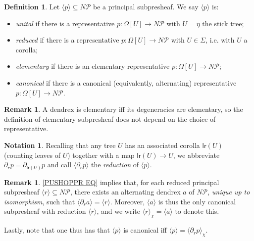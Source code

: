 \documentclass[a4paper,10pt
,draft
]{article}%
\numberwithin{equation}{section}
\numberwithin{figure}{section}
\theoremstyle{definition} %
\newtheorem{definition}[equation]{Definition}%
\newtheorem{remark}[equation]{Remark}%
\newtheorem{notation}[equation]{Notation}%
\newcommand{\1}{\ensuremath{\mathbbm 1}}%
\begin{document}
\begin{definition}
	Let $\langle p \rangle \subseteq N \mathcal{P}$ be 
	a principal subpresheaf. 
	We say $\langle p \rangle$ is:
	\begin{itemize}
		\item \emph{unital} if there is a representative
		$p\colon \Omega[U] \to N \mathcal{P}$ with $U=\eta$ the stick tree;
		\item \emph{reduced} if there is a representative
		$p\colon \Omega[U] \to N \mathcal{P}$ with $U \in \Sigma$, i.e. with $U$ a corolla;
		\item \emph{elementary} 
		if there is an elementary representative
		$p\colon \Omega[U] \to N \mathcal{P}$;
		\item \emph{canonical} 
		if there is a canonical (equivalently, alternating) representative
		$p\colon \Omega[U] \to N \mathcal{P}$.
	\end{itemize}
\end{definition}



\begin{remark}
	A dendrex is elementary iff its degeneracies are elementary,
	so the definition of elementary subpresheaf does not depend on the choice of representative.
\end{remark}


\begin{notation}\label{REDUCT NOT}
	Recalling that any tree $U$
	has an associated corolla $\mathsf{lr}(U)$ (counting leaves of $U$) together with a map
	$\mathsf{lr}(U) \to U$, 
	we abbreviate
	$\partial_r p = \partial_{\mathsf{lr}(U)}p$
	and call
	$\langle \partial_r p \rangle$
	the \emph{reduction} of  
	$\langle p \rangle$.
\end{notation}




\begin{remark}\label{PUSHOPPRRST REM}
	\eqref{PUSHOPPR EQ} 
	implies
	that, for each reduced principal subpresheaf
	$\langle r \rangle \subseteq N \mathcal{P}$,
	there exists an alternating dendrex $a$ of $N \mathcal P$, 
	\emph{unique up to isomorphism}, 
	such that
	$\langle \partial_r a \rangle = \langle r \rangle$.
	Moreover, $\langle a \rangle$ is thus the only canonical subpresheaf with reduction 
	$\langle r \rangle$,
	and we write
	$\langle r \rangle_{\chi} = \langle a \rangle$
	to denote this.
	
	Lastly, note that one thus has that 
	$\langle p \rangle$ is canonical iff
	$\langle p \rangle = \langle \partial_r p \rangle_{\chi}$.
\end{remark}
\end{document}
